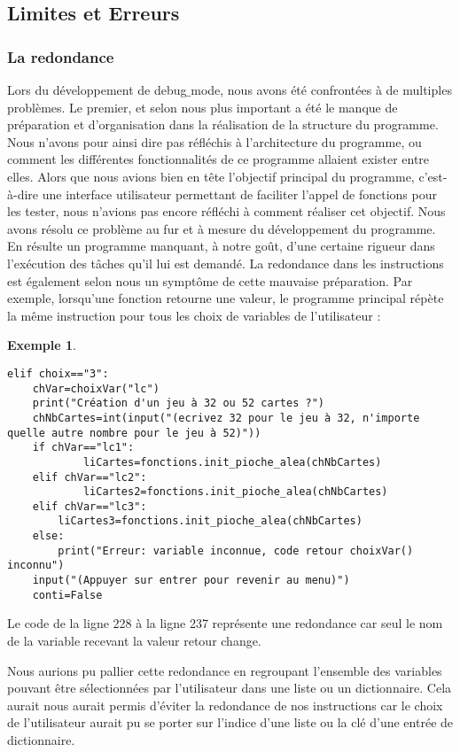 \documentclass[10pt,a4paper,french,titlepage]{article}
\theoremstyle{definition}
\newtheorem{exmp}{Exemple}
\begin{document}
\subsection{Limites et Erreurs}
\subsubsection{La redondance}
Lors du développement de debug$\_$mode, nous avons été confrontées à de multiples problèmes. Le premier, et selon nous plus important a été le manque de préparation et d'organisation dans la réalisation de la structure du programme. Nous n'avons pour ainsi dire pas réfléchis à l'architecture du programme, ou comment les différentes fonctionnalités de ce programme allaient exister entre elles. Alors que nous avions bien en tête l'objectif principal du programme, c’est-à-dire une interface utilisateur permettant de faciliter l'appel de fonctions pour les tester, nous n'avions pas encore réfléchi à comment réaliser cet objectif. Nous avons résolu ce problème au fur et à mesure du développement du programme. En résulte un programme manquant, à notre goût, d'une certaine rigueur dans l'exécution des tâches qu'il lui est demandé. La redondance dans les instructions est également selon nous un symptôme de cette mauvaise préparation. Par exemple, lorsqu’une fonction retourne une valeur, le programme principal répète la même instruction pour tous les choix de variables de l’utilisateur :
\begin{exmp}
\begin{lstlisting}
elif choix=="3":
	chVar=choixVar("lc")
    print("Création d'un jeu à 32 ou 52 cartes ?")
    chNbCartes=int(input("(ecrivez 32 pour le jeu à 32, n'importe 	quelle autre nombre pour le jeu à 52)"))
    if chVar=="lc1":
    		liCartes=fonctions.init_pioche_alea(chNbCartes)
    elif chVar=="lc2":
    		liCartes2=fonctions.init_pioche_alea(chNbCartes)
	elif chVar=="lc3":
		liCartes3=fonctions.init_pioche_alea(chNbCartes)
    else:
		print("Erreur: variable inconnue, code retour choixVar() 		inconnu")
    input("(Appuyer sur entrer pour revenir au menu)")
	conti=False
\end{lstlisting}
Le code de la ligne 228 à la ligne 237 représente une redondance car seul le nom de la variable recevant la valeur retour change.
\end{exmp}
Nous aurions pu pallier cette redondance en regroupant l'ensemble des variables pouvant être sélectionnées par l'utilisateur dans une liste ou un dictionnaire. Cela aurait nous aurait permis d'éviter la redondance de nos instructions car le choix de l'utilisateur aurait pu se porter sur l'indice d'une liste ou la clé d'une entrée de dictionnaire.
\end{document}
